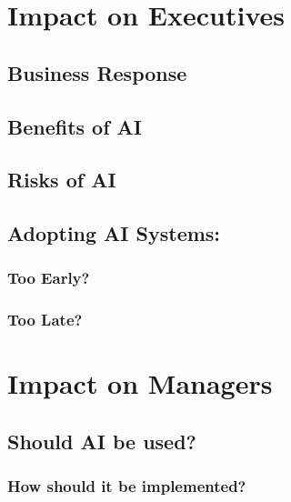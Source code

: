 \documentclass[
]{book}
\begin{document}
\hypertarget{impact-on-executives}{%
\chapter{Impact on Executives}\label{impact-on-executives}}

\hypertarget{business-response}{%
\section{Business Response}\label{business-response}}

\hypertarget{benefits-of-ai}{%
\section{Benefits of AI}\label{benefits-of-ai}}

\hypertarget{risks-of-ai}{%
\section{Risks of AI}\label{risks-of-ai}}

\hypertarget{adopting-ai-systems}{%
\section{Adopting AI Systems:}\label{adopting-ai-systems}}

\hypertarget{too-early}{%
\subsection{Too Early?}\label{too-early}}

\hypertarget{too-late}{%
\subsection{Too Late?}\label{too-late}}

\hypertarget{impact-on-managers}{%
\chapter{Impact on Managers}\label{impact-on-managers}}

\hypertarget{should-ai-be-used}{%
\section{Should AI be used?}\label{should-ai-be-used}}

\hypertarget{how-should-it-be-implemented}{%
\subsection{How should it be implemented?}\label{how-should-it-be-implemented}}
\end{document}
